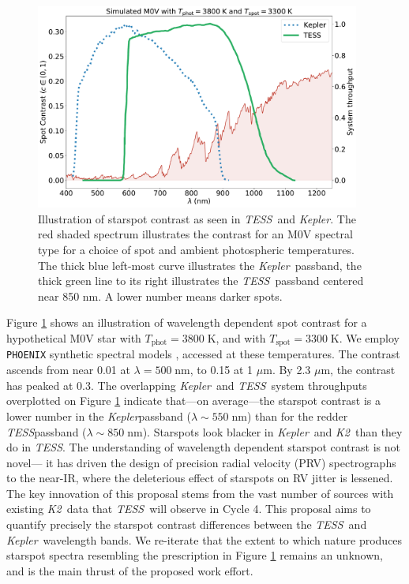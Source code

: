 \documentclass[modern]{aastex631}
\newcommand{\tess}{{\it TESS}}
\newcommand{\kepler}{{\it Kepler}}
\newcommand{\ktwo}{{\it K2}}
\begin{document}
\begin{figure}[hbt!]
  \includegraphics[width=0.95\textwidth]{figures/contrast_spectrum2.pdf}
  \caption{Illustration of starspot contrast as seen in \tess\ and \kepler. The red shaded spectrum illustrates the contrast for an M0V spectral type for a choice of spot and ambient photospheric temperatures. The thick blue left-most curve illustrates the \kepler\ passband, the thick green line to its right illustrates the \tess\ passband centered near 850 nm.  A lower number means darker spots.  }
  \label{fig:filtercurve}
\end{figure}

Figure \ref{fig:filtercurve} shows an illustration of wavelength dependent spot contrast for a hypothetical M0V star with $T_\mathrm{phot}=3800\;$K, and with $T_\mathrm{spot}=3300\;$K.  We employ \texttt{PHOENIX} synthetic spectral models \cite{2013A&A...553A...6H}, accessed at these temperatures.  The contrast ascends from near 0.01 at $\lambda=500\;$nm, to 0.15 at 1 $\mu$m.  By 2.3 $\mu$m, the contrast has peaked at 0.3.  The overlapping \kepler\ and \tess\ system throughputs overplotted on Figure \ref{fig:filtercurve} indicate that---on average---the starspot contrast is a lower number in the \kepler passband ($\lambda \sim 550\;$nm)  than for the redder \tess passband ($\lambda \sim 850\;$nm).  Starspots look blacker in \kepler\ and \ktwo\ than they do in \tess.  The understanding of wavelength dependent starspot contrast is not novel--- it has driven the design of precision radial velocity (PRV) spectrographs to the near-IR, where the deleterious effect of starspots on RV jitter is lessened.  The key innovation of this proposal stems from the vast number of sources with existing \ktwo\ data that \tess\ will observe in Cycle 4.  This proposal aims to quantify precisely the starspot contrast differences between the \tess\ and \kepler\ wavelength bands.  We re-iterate that the extent to which nature produces starspot spectra resembling the prescription in Figure \ref{fig:filtercurve} remains an unknown, and is the main thrust of the proposed work effort.
\end{document}
